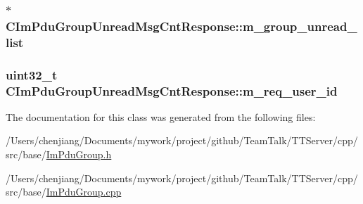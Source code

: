 \subsubsection[{m\+\_\+group\+\_\+unread\+\_\+list}]{$\ast$ C\+Im\+Pdu\+Group\+Unread\+Msg\+Cnt\+Response\+::m\+\_\+group\+\_\+unread\+\_\+list\hspace{0.3cm}{\ttfamily [private]}}\label{class_c_im_pdu_group_unread_msg_cnt_response_a0c39ff6c93b9f0c7a5ced375a6bfcd76}
\hypertarget{class_c_im_pdu_group_unread_msg_cnt_response_a74c537bd846dff72d98b2b203fbd61f1}{}
\subsubsection[{m\+\_\+req\+\_\+user\+\_\+id}]{\setlength{\rightskip}{0pt plus 5cm}uint32\+\_\+t C\+Im\+Pdu\+Group\+Unread\+Msg\+Cnt\+Response\+::m\+\_\+req\+\_\+user\+\_\+id\hspace{0.3cm}{\ttfamily [private]}}\label{class_c_im_pdu_group_unread_msg_cnt_response_a74c537bd846dff72d98b2b203fbd61f1}


The documentation for this class was generated from the following files\+:\begin{DoxyCompactItemize}
\item 
/\+Users/chenjiang/\+Documents/mywork/project/github/\+Team\+Talk/\+T\+T\+Server/cpp/src/base/\hyperlink{_im_pdu_group_8h}{Im\+Pdu\+Group.\+h}\item 
/\+Users/chenjiang/\+Documents/mywork/project/github/\+Team\+Talk/\+T\+T\+Server/cpp/src/base/\hyperlink{_im_pdu_group_8cpp}{Im\+Pdu\+Group.\+cpp}\end{DoxyCompactItemize}
